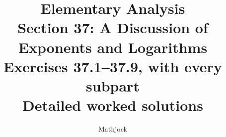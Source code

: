 
\title{\textbf{Elementary Analysis}\\[0.3em]
Section 37: A Discussion of Exponents and Logarithms\\[0.4em]
\large Exercises 37.1--37.9, with every subpart\\
Detailed worked solutions}
\author{Mathjock}
\date{}

\maketitle
\bookinfo
\tableofcontents
\clearpage
\setcounter{section}{36}


